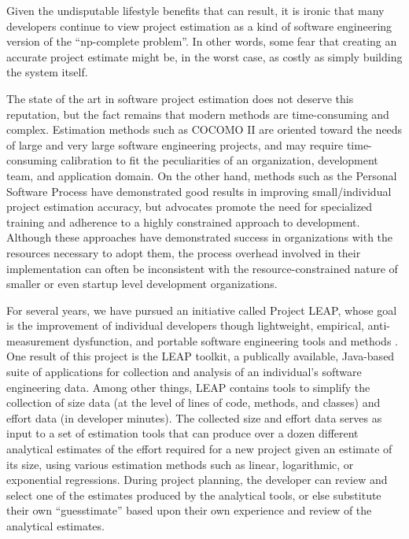 Given the undisputable lifestyle benefits that can result, it is ironic
that many developers continue to view project estimation as a kind of
software engineering version of the ``np-complete problem''. In other
words, some fear that creating an accurate project estimate might be, in the worst
case, as costly as simply building the system itself.

The state of the art in software project estimation does not deserve this
reputation, but the fact remains that modern methods are time-consuming and
complex. Estimation methods such as COCOMO II \cite{Boehm95} are oriented
toward the needs of large and very large software engineering projects, and
may require time-consuming calibration to fit the peculiarities of an
organization, development team, and application domain.  On the other hand,
methods such as the Personal Software Process \cite{Humphrey95} have demonstrated good results in improving small/individual project estimation
accuracy, but advocates promote the need for specialized training and
adherence to a highly constrained approach to development.  Although these
approaches have demonstrated success in organizations with the resources
necessary to adopt them, the process overhead involved in their
implementation can often be inconsistent with the resource-constrained
nature of smaller or even startup level development organizations.

For several years, we have pursued an initiative called Project LEAP, whose
goal is the improvement of individual developers though lightweight,
empirical, anti-measurement dysfunction, and portable software engineering
tools and methods \cite{csdl2-00-01}.  One result of this project is the
LEAP toolkit, a publically available, Java-based suite of applications for
collection and analysis of an individual's software engineering data.
Among other things, LEAP contains tools to simplify the collection of size
data (at the level of lines of code, methods, and classes) and effort data
(in developer minutes). The collected size and effort data serves as input
to a set of estimation tools that can produce over a dozen different
analytical estimates of the effort required for a new project given an
estimate of its size, using various estimation methods such as linear,
logarithmic, or exponential regressions.  During project planning, the
developer can review and select one of the estimates produced by the
analytical tools, or else substitute their own ``guesstimate'' based upon
their own experience and review of the analytical estimates.

